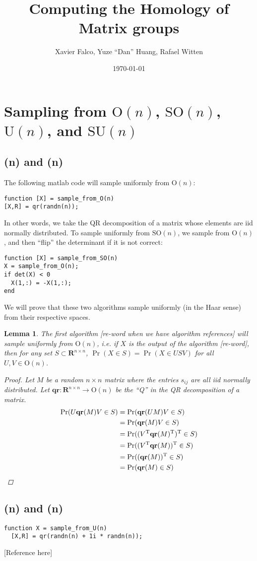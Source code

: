 \documentclass[letterpaper,12pt]{article}
\title{Computing the Homology of Matrix groups}
\author{Xavier Falco, Yuze ``Dan'' Huang, Rafael Witten}
\date{\today}
\newtheorem{lemma}{Lemma}
\newcommand{\Tr}{^\text{T}}
\newcommand{\reals}{\mathbf{R}}
\newcommand{\MG}[2]{\text{#1}(#2)}
\newcommand{\qr}{\mathbf{qr}}
\begin{document}
\begin{titlepage}
\vspace{3in}
\maketitle
\thispagestyle{empty}
\end{titlepage}
\tableofcontents
\thispagestyle{empty}
\section{Sampling from $\MG{O}{n}$, $\MG{SO}{n}$, $\MG{U}{n}$, and $\MG{SU}{n}$}

\subsection{\MG{O}{n} and \MG{SO}{n}}
The following matlab code will sample uniformly from $\MG{O}{n}$:

\begin{verbatim}
function [X] = sample_from_O(n)
[X,R] = qr(randn(n));
\end{verbatim}

In other words, we take the QR decomposition of a matrix whose elements are iid
  normally distributed.
To sample uniformly from $\MG{SO}{n}$, we sample from $\MG{O}{n}$, and then
  ``flip'' the determinant if it is not correct:

\begin{verbatim}
function [X] = sample_from_SO(n)
X = sample_from_O(n);
if det(X) < 0
  X(1,:) = -X(1,:);
end
\end{verbatim}

We will prove that these two algorithms sample uniformly (in the Haar sense)
  from their respective spaces.

\begin{lemma}
The first algorithm [re-word when we have algorithm references] will sample
  uniformly from $\MG{O}{n}$, i.e. if $X$ is the output of the algorithm
  [re-word], then for any set $S\subset \reals^{n\times n}$, $\Pr(X\in S) =
  \Pr(X\in USV)$ for all $U,V \in \MG{O}{n}$.

\begin{proof}
Let $M$ be a random $n\times n$ matrix where the entries $s_{ij}$ are all iid
  normally distributed.
Let $\qr:\reals^{n\times n} \to \MG{O}{n}$ be the ``Q'' in the QR decomposition
  of a matrix.
\begin{align}
\Pr(U\qr(M)V\in S) &= \Pr(\qr(UM)V \in S)\\
  &= \Pr(\qr(M)V \in S)\\
  &= \Pr( (V\Tr\qr(M)\Tr)\Tr \in S)\\
  &= \Pr( (V\Tr\qr(M))\Tr \in S) \\
  &= \Pr((\qr(M))\Tr \in S)\\
  &= \Pr(\qr(M) \in S)\qedhere
\end{align}
\end{proof}
\end{lemma}

\subsection{\MG{U}{n} and \MG{SU}{n}}

\begin{verbatim}
function X = sample_from_U(n)
  [X,R] = qr(randn(n) + 1i * randn(n));
\end{verbatim}
[Reference here]


\thispagestyle{empty}


\end{document}
